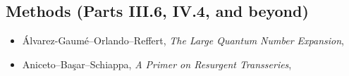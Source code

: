 \subsection*{Methods (Parts III.6, IV.4, and beyond)}
\begin{itemize}
\item[$\bullet$] \'Alvarez-Gaum\'e--Orlando--Reffert, \emph{The Large Quantum Number Expansion}, 
\item[$\bullet$] Aniceto--Ba\c{s}ar--Schiappa, \emph{A Primer on Resurgent Transseries}, 
\end{itemize}
